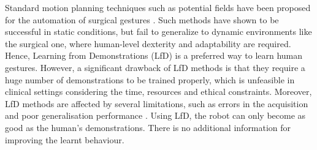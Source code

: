 \documentclass[letterpaper, 10 pt, conference]{ieeeconf}
\begin{document}
Standard motion planning techniques such as potential fields have been proposed for the automation of surgical gestures \cite{ginesi2019dynamic}. Such methods have shown to be successful in static conditions, but fail to generalize to dynamic environments like the surgical one, where human-level dexterity and adaptability are required.
Hence, Learning from Demonstrations (LfD) is a preferred way to learn human gestures. 
However, a significant drawback of LfD methods is that they require a huge number of demonstrations to be trained properly, which is unfeasible in clinical settings considering the time, resources and ethical constraints.
Moreover, LfD methods are affected by several limitations, such as errors in the acquisition and poor generalisation performance \cite{hussein2017imitation}.
Using LfD, the robot can only become as good as the human's demonstrations. There is no additional information for improving the learnt behaviour. 

\end{document}
